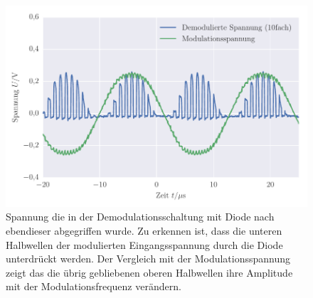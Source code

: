 
\FloatBarrier
\begin{figure}[!h]
\centering
\includegraphics[scale=1]{../Grafiken/Amplituden_Modulation_Diode_Demodulation_Gleichrichter.pdf}
\caption{Spannung die in der Demodulationsschaltung mit Diode nach ebendieser abgegriffen wurde.
	Zu erkennen ist, dass die unteren Halbwellen der modulierten Eingangsspannung durch die Diode
	unterdrückt werden. Der Vergleich mit der Modulationsspannung zeigt das die übrig gebliebenen 
	oberen Halbwellen ihre Amplitude mit der Modulationsfrequenz verändern.   
	\label{fig:amplituden_modulation_diode_demodulation_gleichrichter}}
\end{figure}
\FloatBarrier